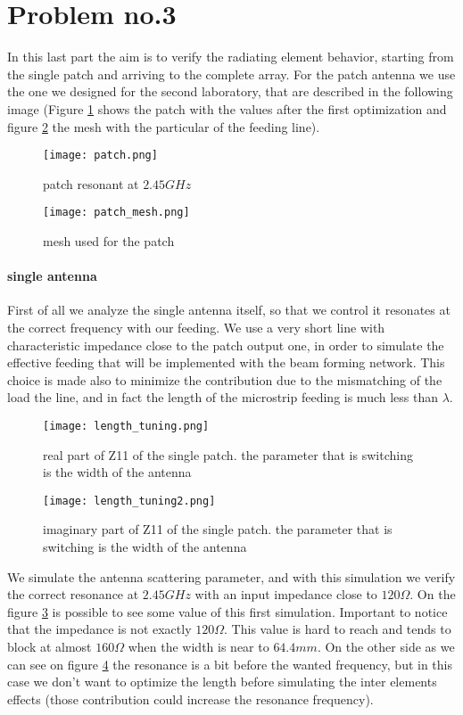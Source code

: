 \section{Problem no.3}
In this last part the aim is to verify the radiating element behavior, starting from the single patch and arriving to the complete array. For the patch antenna we use the one we designed for the second laboratory, that are described in the following image (Figure \ref{patch} shows the patch with the values after the first optimization and figure \ref{patch_mesh} the mesh with the particular of the feeding line).
\begin{figure}[H]
	\centering
	\texttt{[image: patch.png]}
	\caption{patch resonant at $2.45GHz$}
	\label{patch}
\end{figure}
\begin{figure}[H]
	\centering
	\texttt{[image: patch\_mesh.png]}
	\caption{mesh used for the patch}
	\label{patch_mesh}
\end{figure}

\paragraph{single antenna} First of all we analyze the single antenna itself, so that we control it resonates at the correct frequency with our feeding. We use a very short line with characteristic impedance close to the patch output one, in order to simulate the effective feeding that will be implemented with the beam forming network. This choice is made also to minimize the contribution due to the mismatching of the load the line, and in fact the length of the microstrip feeding is much less than $\lambda$.
\begin{figure}[H]
	\centering
	\texttt{[image: length\_tuning.png]}
	\caption{real part of Z11 of the single patch. the parameter that is switching is the width of the antenna}
	\label{length_tuning}
\end{figure}
\begin{figure}[H]
	\centering
	\texttt{[image: length\_tuning2.png]}
	\caption{imaginary part of Z11 of the single patch. the parameter that is switching is the width of the antenna}
	\label{length_tuning2}
\end{figure}
We simulate the antenna scattering parameter, and with this simulation we verify the correct resonance at $2.45GHz$ with an input impedance close to $120\Omega$. On the figure \ref{length_tuning} is possible to see some value of this first simulation. Important to notice that  the impedance is not exactly $120\Omega$. This value is hard to reach and tends to block at almost $160\Omega$ when the width is near to $64.4mm$. On the other side as we can see on figure \ref{length_tuning2} the resonance is a bit before the wanted frequency, but in this case we don't want to optimize the length before simulating the inter elements effects (those contribution could increase the resonance frequency).

